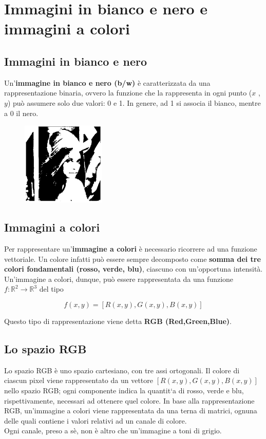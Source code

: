 \section{Immagini in bianco e nero e immagini a colori}

\subsection{Immagini in bianco e nero}

Un'\textbf{immagine in bianco e nero (b/w)} è caratterizzata da una
rappresentazione binaria, ovvero la funzione che la rappresenta in
ogni punto ($x$ , $y$) può assumere solo due valori: 0 e 1. In genere,
ad 1 si associa il bianco, mentre a 0 il nero.

\begin{figure}[H]
    \centering
    \includegraphics[width=4cm, keepaspectratio]{capitoli/immagini/imgs/immagine_binaria_bianco_nero.jpg}
\end{figure}

\subsection{Immagini a colori}

Per rappresentare un'\textbf{immagine a colori} è necessario ricorrere ad
una funzione vettoriale. Un colore infatti può essere sempre
decomposto come \textbf{somma dei tre colori fondamentali (rosso, verde,
    blu)}, ciascuno con un'opportuna intensità.
Un'immagine a colori, dunque, può essere rappresentata da una
funzione $f: \mathbb{R}^2 \rightarrow \mathbb{R}^3$ del tipo

$$
    f(x, y) = [R(x, y), G(x, y), B(x, y)]
$$

Questo tipo di rappresentazione viene detta \textbf{RGB (Red,Green,Blue)}.
\subsection{Lo spazio RGB}

Lo spazio RGB è uno spazio cartesiano, con tre assi ortogonali.
Il colore di ciascun pixel viene rappresentato da un vettore
$[R(x , y), G(x , y), B(x , y)]$ nello spazio RGB; ogni componente
indica la quantit`a di rosso, verde e blu, rispettivamente, necessari
ad ottenere quel colore.
In base alla rappresentazione RGB, un'immagine a colori viene
rappresentata da una terna di matrici, ognuna delle quali contiene i
valori relativi ad un canale di colore.\\
Ogni canale, preso a sè, non è altro che un'immagine a toni di
grigio.

